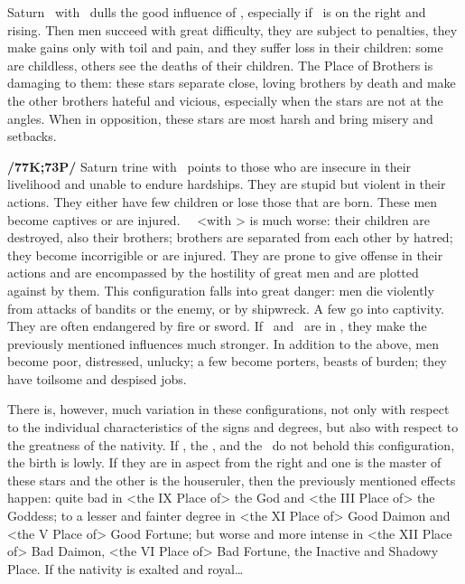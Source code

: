 Saturn \Square\, with \Jupiter\, dulls the good influence of \Jupiter, especially if \Saturn\, is on the right and rising. Then men succeed with great difficulty, they are subject to penalties, they make gains only with
toil and pain, and they suffer loss in their children: some are childless, others see the deaths of their children. The Place of Brothers is damaging to them: these stars separate close, loving brothers by death and make the other brothers hateful and vicious, especially when the stars are not at the angles. When in opposition, these stars are most harsh and bring misery and setbacks.

\textbf{/77K;73P/} Saturn \marginnote{\Saturn \Trine \Mars} trine with \Mars\, points to those who are insecure in their livelihood and unable to endure hardships. They are stupid but violent in their actions. They either have few children or lose those that are born. These men become captives or are injured. \Saturn\, \Square\, <with \Mars> is much worse: their children are destroyed, also their brothers; brothers are separated from each other by hatred; they become incorrigible or are injured. They are prone to give offense in their actions and are encompassed by the hostility of great men and are plotted against by them. This configuration falls into great danger: men die violently from attacks of bandits or the enemy, or by shipwreck. A few go into captivity. They are often endangered by fire or sword. If \Saturn\, and \Mars\, are in \Opposition, they make the previously mentioned influences much stronger. In addition to the above, men become poor, distressed, unlucky; a few become porters, beasts of burden; they have toilsome and despised jobs. 

There \mndl is, however, much variation in these configurations, not only with respect to the individual characteristics of the signs and degrees, but also with respect to the greatness of the nativity. If \Jupiter, the
\Moon, and the \Sun\, do not behold this configuration, the birth is lowly. If they are in aspect from the right
and one is the master of these stars and the other is the houseruler, then the previously mentioned effects happen: quite bad in <the IX Place of> the God and <the III Place of> the Goddess; to a lesser and fainter degree in <the XI Place of> Good Daimon and <the V Place of> Good Fortune; but worse and more intense in <the XII Place of> Bad Daimon, <the VI Place of> Bad Fortune, the Inactive and Shadowy Place. If the nativity is exalted and royal\ldots

